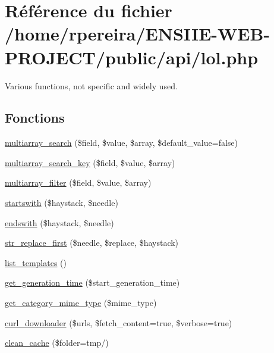 \hypertarget{lol_8php}{}\section{Référence du fichier /home/rpereira/\+E\+N\+S\+I\+I\+E-\/\+W\+E\+B-\/\+P\+R\+O\+J\+E\+C\+T/public/api/lol.php}
\label{lol_8php}


Various functions, not specific and widely used.  


\subsection*{Fonctions}
\begin{DoxyCompactItemize}
\item 
\hyperlink{lol_8php_a97fe54fd1c1f43c5b79d9c2e253c42a1}{multiarray\+\_\+search} (\$field, \$value, \$array, \$default\+\_\+value=false)
\item 
\hyperlink{lol_8php_a5133dd10d633e75afb662cd8753c7c3f}{multiarray\+\_\+search\+\_\+key} (\$field, \$value, \$array)
\item 
\hyperlink{lol_8php_a467bbf964092ca25b7fd7b94b32725de}{multiarray\+\_\+filter} (\$field, \$value, \$array)
\item 
\hyperlink{lol_8php_aad427741d142b867fd23b6c9e291cbc8}{startswith} (\$haystack, \$needle)
\item 
\hyperlink{lol_8php_a2c0472bf77404493f459f2f392bc6cfd}{endswith} (\$haystack, \$needle)
\item 
\hyperlink{lol_8php_a663921c08c6e251b51ca06a34a796bb3}{str\+\_\+replace\+\_\+first} (\$needle, \$replace, \$haystack)
\item 
\hyperlink{lol_8php_a0f2b119b5fbb89b4355541cabdf0b2b4}{list\+\_\+templates} ()
\item 
\hyperlink{lol_8php_ab71a840938f7bbf34a89b9f9ab4af671}{get\+\_\+generation\+\_\+time} (\$start\+\_\+generation\+\_\+time)
\item 
\hyperlink{lol_8php_a29d98d715efe41dae9c399ef52a44445}{get\+\_\+category\+\_\+mime\+\_\+type} (\$mime\+\_\+type)
\item 
\hyperlink{lol_8php_a4f2354fbb8df0aa2bf481b131519bd3e}{curl\+\_\+downloader} (\$urls, \$fetch\+\_\+content=true, \$verbose=true)
\item 
\hyperlink{lol_8php_a675a3ef7611bceb202dcfc25a5ee728e}{clean\+\_\+cache} (\$folder=\textquotesingle{}tmp/\textquotesingle{})

\end{DoxyCompactItemize}
